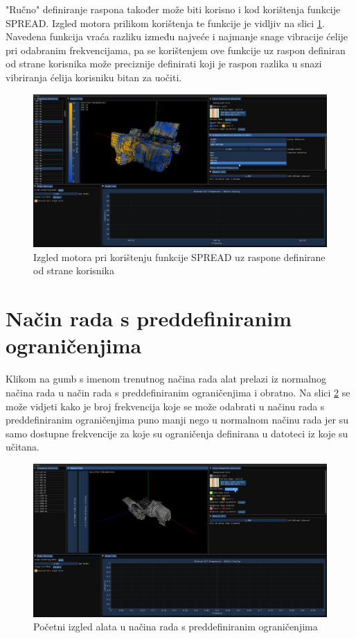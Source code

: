 \documentclass[times, utf8, diplomski]{fer}
\begin{document}
"Ručno" definiranje raspona također može biti korisno i kod korištenja funkcije SPREAD. Izgled motora prilikom korištenja te funkcije je vidljiv na slici \ref{fig:spread-view}. Navedena funkcija vraća razliku između najveće i najmanje snage vibracije ćelije pri odabranim frekvencijama, pa se korištenjem ove funkcije uz raspon definiran od strane korisnika može preciznije definirati koji je raspon razlika u snazi vibriranja ćelija korisniku bitan za uočiti. 

\begin{figure} [H]
	\centering
    \includegraphics[width=\textwidth]{demonstration/spread.png}
    \caption{Izgled motora pri korištenju funkcije SPREAD uz raspone definirane od strane korisnika}
    \label{fig:spread-view}
\end{figure}

\section{Način rada s preddefiniranim ograničenjima}

Klikom na gumb s imenom trenutnog načina rada alat prelazi iz normalnog načina rada u način rada s preddefiniranim ograničenjima i obratno. Na slici \ref{fig:limits-mode-switched} se može vidjeti kako je broj frekvencija koje se može odabrati u načinu rada s preddefiniranim ograničenjima puno manji nego u normalnom načinu rada jer su samo dostupne frekvencije za koje su ograničenja definirana u datoteci iz koje su učitana.

\begin{figure} [H]
	\centering
    \includegraphics[width=\textwidth]{demonstration/limits_mode_opened.png}
    \caption{Početni izgled alata u načina rada s preddefiniranim ograničenjima}
    \label{fig:limits-mode-switched}
\end{figure}
\end{document}
